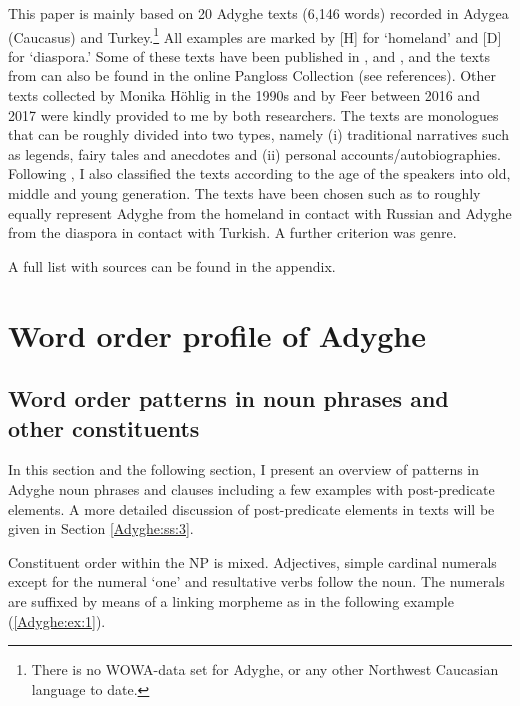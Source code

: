 \documentclass[output=paper,colorlinks,citecolor=brown, draft]{langscibook}
\begin{document}
\newpage
\begin{sloppypar}
This paper is mainly based on 20 Adyghe texts (6,146 words) recorded in Adygea (Caucasus) and Turkey.\footnote{
There is no WOWA-data set for Adyghe, or any other Northwest Caucasian language to date.
} All examples are marked by [H] for `homeland' and [D] for `diaspora.' Some of these texts have been published in \citet{hohlig1997kontaktbedingter}, \citet{paris1974princesse} and \citet{feer2019grammar}, and the texts from \citet{paris1974princesse} can also be found in the online Pangloss Collection (see references). Other texts collected by Monika Höhlig in the 1990s and by Feer between 2016 and 2017 were kindly provided to me by both researchers. The texts are monologues that can be roughly divided into two types, namely (i) traditional narratives such as legends, fairy tales and anecdotes and (ii) personal accounts/autobiographies. Following \citet{hohlig1997kontaktbedingter}, I also classified the texts according to the age of the speakers into old, middle and young generation. The texts have been chosen such as to roughly equally represent Adyghe from the homeland in contact with Russian and Adyghe from the diaspora in contact with Turkish. A further criterion was genre. 
\end{sloppypar}

A full list with sources can be found in the appendix.

\section{Word order profile of Adyghe}\label{Adyghe:ss:2}

\subsection{Word order patterns in noun phrases and other constituents}\label{Adyghe:ss:2.1}

In this section and the following section, I present an overview of  patterns in Adyghe noun phrases and clauses including a few examples with post-predicate elements. A more detailed discussion of post-predicate elements in texts will be given in Section \ref{Adyghe:ss:3}. 

Constituent order within the NP is mixed. Adjectives, simple cardinal numerals except for the numeral `one' and resultative verbs follow the noun. The numerals are suffixed by means of a linking morpheme as in the following example (\ref{Adyghe:ex:1}).
\end{document}
